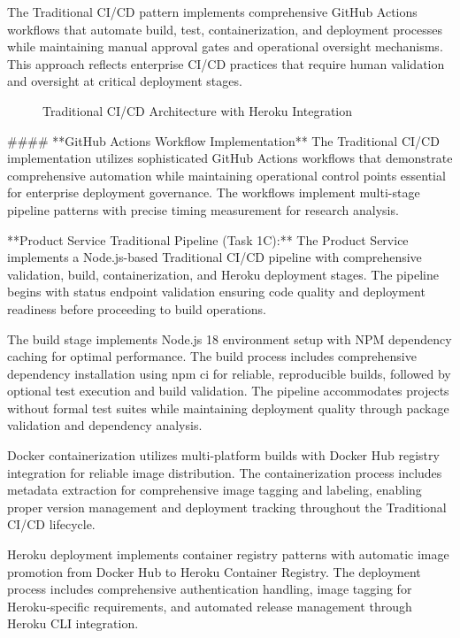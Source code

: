The Traditional CI/CD pattern implements comprehensive GitHub Actions workflows that automate build, test, containerization, and deployment processes while maintaining manual approval gates and operational oversight mechanisms. This approach reflects enterprise CI/CD practices that require human validation and oversight at critical deployment stages.

\begin{figure}[H]
\centering
\caption{Traditional CI/CD Architecture with Heroku Integration}
\label{fig:traditional-cicd-architecture}
\end{figure}

#### **GitHub Actions Workflow Implementation**
The Traditional CI/CD implementation utilizes sophisticated GitHub Actions workflows that demonstrate comprehensive automation while maintaining operational control points essential for enterprise deployment governance. The workflows implement multi-stage pipeline patterns with precise timing measurement for research analysis.

**Product Service Traditional Pipeline (Task 1C):**
The Product Service implements a Node.js-based Traditional CI/CD pipeline with comprehensive validation, build, containerization, and Heroku deployment stages. The pipeline begins with status endpoint validation ensuring code quality and deployment readiness before proceeding to build operations.

The build stage implements Node.js 18 environment setup with NPM dependency caching for optimal performance. The build process includes comprehensive dependency installation using npm ci for reliable, reproducible builds, followed by optional test execution and build validation. The pipeline accommodates projects without formal test suites while maintaining deployment quality through package validation and dependency analysis.

Docker containerization utilizes multi-platform builds with Docker Hub registry integration for reliable image distribution. The containerization process includes metadata extraction for comprehensive image tagging and labeling, enabling proper version management and deployment tracking throughout the Traditional CI/CD lifecycle.

Heroku deployment implements container registry patterns with automatic image promotion from Docker Hub to Heroku Container Registry. The deployment process includes comprehensive authentication handling, image tagging for Heroku-specific requirements, and automated release management through Heroku CLI integration.

